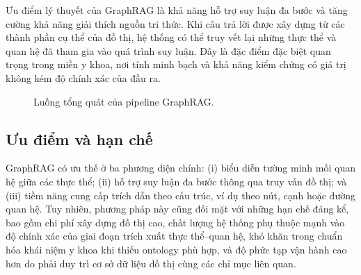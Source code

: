 \documentclass[a4paper,12pt,twoside]{report}
\begin{document}
Ưu điểm lý thuyết của GraphRAG là khả năng hỗ trợ suy luận đa bước và tăng cường khả năng giải thích nguồn tri thức. Khi câu trả lời được xây dựng từ các thành phần cụ thể của đồ thị, hệ thống có thể truy vết lại những thực thể và quan hệ đã tham gia vào quá trình suy luận. Đây là đặc điểm đặc biệt quan trọng trong miền y khoa, nơi tính minh bạch và khả năng kiểm chứng có giá trị không kém độ chính xác của đầu ra.

\begin{figure}[H]
  \centering
  \caption{Luồng tổng quát của pipeline GraphRAG.}
  \label{fig:graphrag-flow}
\end{figure}

\subsection{Ưu điểm và hạn chế}
GraphRAG có ưu thế ở ba phương diện chính: (i) biểu diễn tường minh mối quan hệ giữa các thực thể; (ii) hỗ trợ suy luận đa bước thông qua truy vấn đồ thị; và (iii) tiềm năng cung cấp trích dẫn theo cấu trúc, ví dụ theo nút, cạnh hoặc đường quan hệ. Tuy nhiên, phương pháp này cũng đối mặt với những hạn chế đáng kể, bao gồm chi phí xây dựng đồ thị cao, chất lượng hệ thống phụ thuộc mạnh vào độ chính xác của giai đoạn trích xuất thực thể--quan hệ, khó khăn trong chuẩn hóa khái niệm y khoa khi thiếu ontology phù hợp, và độ phức tạp vận hành cao hơn do phải duy trì cơ sở dữ liệu đồ thị cùng các chỉ mục liên quan.
\end{document}
